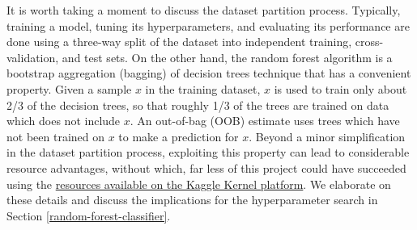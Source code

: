 \documentclass[11pt]{article}
\theoremstyle{definition}
\numberwithin{equation}{section}
\begin{document}
It is worth taking a moment to discuss the dataset partition process.
Typically, training a model, tuning its hyperparameters, and evaluating
its performance are done using a three-way split of the dataset into
independent training, cross-validation, and test sets. On the other
hand, the random forest algorithm is a bootstrap aggregation (bagging)
of decision trees technique that has a convenient property. Given a
sample \(x\) in the training dataset, \(x\) is used to train only about
2/3 of the decision trees, so that roughly 1/3 of the trees are trained
on data which does not include \(x\). An out-of-bag (OOB) estimate uses
trees which have not been trained on \(x\) to make a prediction for
\(x\). Beyond a minor simplification in the dataset partition process,
exploiting this property can lead to considerable resource
advantages, without which, far less of this project could
have succeeded using the
\href{https://www.kaggle.com/docs/kernels\#technical-specifications}{resources
  available on the Kaggle Kernel platform}. We elaborate on these details
and discuss the implications for the hyperparameter search in
Section \ref{random-forest-classifier}.
\end{document}
